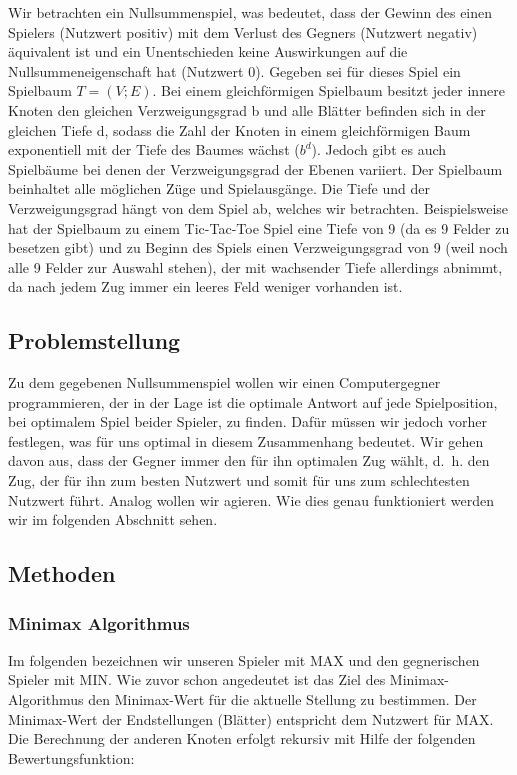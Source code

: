 Wir betrachten ein Nullsummenspiel, was bedeutet, dass der Gewinn des einen Spielers (Nutzwert positiv) mit dem Verlust des Gegners (Nutzwert negativ) äquivalent ist und ein Unentschieden keine Auswirkungen auf die Nullsummeneigenschaft hat (Nutzwert 0).
Gegeben sei für dieses Spiel ein Spielbaum $T = (V;E)$. Bei einem gleichförmigen Spielbaum besitzt jeder innere Knoten den gleichen Verzweigungsgrad b und alle Blätter befinden sich in der gleichen Tiefe d, sodass die Zahl der Knoten in einem gleichförmigen Baum exponentiell mit der Tiefe des Baumes wächst ($b^d$). Jedoch gibt es auch Spielbäume bei denen der Verzweigungsgrad der Ebenen variiert.
Der Spielbaum beinhaltet alle möglichen Züge und Spielausgänge. Die Tiefe und der Verzweigungsgrad hängt von dem Spiel ab, welches wir betrachten. Beispielsweise hat der Spielbaum zu einem Tic-Tac-Toe Spiel eine Tiefe von 9 (da es 9 Felder zu besetzen gibt) und zu Beginn des Spiels einen Verzweigungsgrad von 9 (weil noch alle 9 Felder zur Auswahl stehen), der mit wachsender Tiefe allerdings abnimmt, da nach jedem Zug immer ein leeres Feld weniger vorhanden ist.



\subsection{Problemstellung}
Zu dem gegebenen Nullsummenspiel wollen wir einen Computergegner programmieren, der in der Lage ist die optimale Antwort auf jede Spielposition, bei optimalem Spiel beider Spieler, zu finden.
Dafür müssen wir jedoch vorher festlegen, was für uns optimal in diesem Zusammenhang bedeutet. Wir gehen davon aus, dass der Gegner immer den für ihn optimalen Zug wählt, d.~h. den Zug, der für ihn zum besten Nutzwert und somit für uns zum schlechtesten Nutzwert führt. Analog wollen wir agieren. Wie dies genau funktioniert werden wir im folgenden Abschnitt sehen.



\subsection{Methoden}


\subsubsection*{Minimax Algorithmus}
Im folgenden bezeichnen wir unseren Spieler mit MAX und den gegnerischen Spieler mit MIN. Wie zuvor schon angedeutet ist das Ziel des Minimax-Algorithmus den Minimax-Wert für die aktuelle Stellung zu bestimmen. Der Minimax-Wert der Endstellungen (Blätter) entspricht dem Nutzwert für MAX. Die Berechnung der anderen Knoten erfolgt rekursiv mit Hilfe der folgenden Bewertungsfunktion:


